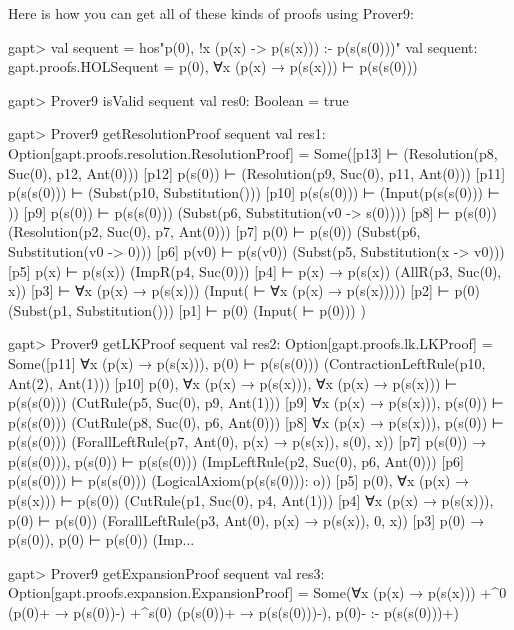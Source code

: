 \documentclass[a4paper,11pt]{book}
\begin{document}
Here is how you can get all of these kinds of proofs using Prover9:
\begin{clilisting}
gapt> val sequent = hos"p(0), !x (p(x) -> p(s(x))) :- p(s(s(0)))"
val sequent: gapt.proofs.HOLSequent = p(0), ∀x (p(x) → p(s(x))) ⊢ p(s(s(0)))

\end{clilisting}

\begin{clilisting}
gapt> Prover9 isValid sequent
val res0: Boolean = true

gapt> Prover9 getResolutionProof sequent
val res1: Option[gapt.proofs.resolution.ResolutionProof] =
Some([p13]  ⊢    (Resolution(p8, Suc(0), p12, Ant(0)))
[p12] p(s(0)) ⊢    (Resolution(p9, Suc(0), p11, Ant(0)))
[p11] p(s(s(0))) ⊢    (Subst(p10, Substitution()))
[p10] p(s(s(0))) ⊢    (Input(p(s(s(0))) ⊢ ))
[p9] p(s(0)) ⊢ p(s(s(0)))   (Subst(p6, Substitution(v0 -> s(0))))
[p8]  ⊢ p(s(0))   (Resolution(p2, Suc(0), p7, Ant(0)))
[p7] p(0) ⊢ p(s(0))   (Subst(p6, Substitution(v0 -> 0)))
[p6] p(v0) ⊢ p(s(v0))   (Subst(p5, Substitution(x -> v0)))
[p5] p(x) ⊢ p(s(x))   (ImpR(p4, Suc(0)))
[p4]  ⊢ p(x) → p(s(x))   (AllR(p3, Suc(0), x))
[p3]  ⊢ ∀x (p(x) → p(s(x)))   (Input( ⊢ ∀x (p(x) → p(s(x)))))
[p2]  ⊢ p(0)   (Subst(p1, Substitution()))
[p1]  ⊢ p(0)   (Input( ⊢ p(0)))
)

gapt> Prover9 getLKProof sequent
val res2: Option[gapt.proofs.lk.LKProof] =
Some([p11] ∀x (p(x) → p(s(x))), p(0) ⊢ p(s(s(0)))    (ContractionLeftRule(p10, Ant(2), Ant(1)))
[p10] p(0), ∀x (p(x) → p(s(x))), ∀x (p(x) → p(s(x))) ⊢ p(s(s(0)))    (CutRule(p5, Suc(0), p9, Ant(1)))
[p9] ∀x (p(x) → p(s(x))), p(s(0)) ⊢ p(s(s(0)))    (CutRule(p8, Suc(0), p6, Ant(0)))
[p8] ∀x (p(x) → p(s(x))), p(s(0)) ⊢ p(s(s(0)))    (ForallLeftRule(p7, Ant(0), p(x) → p(s(x)), s(0), x))
[p7] p(s(0)) → p(s(s(0))), p(s(0)) ⊢ p(s(s(0)))    (ImpLeftRule(p2, Suc(0), p6, Ant(0)))
[p6] p(s(s(0))) ⊢ p(s(s(0)))    (LogicalAxiom(p(s(s(0))): o))
[p5] p(0), ∀x (p(x) → p(s(x))) ⊢ p(s(0))    (CutRule(p1, Suc(0), p4, Ant(1)))
[p4] ∀x (p(x) → p(s(x))), p(0) ⊢ p(s(0))    (ForallLeftRule(p3, Ant(0), p(x) → p(s(x)), 0, x))
[p3] p(0) → p(s(0)), p(0) ⊢ p(s(0))    (Imp...

gapt> Prover9 getExpansionProof sequent
val res3: Option[gapt.proofs.expansion.ExpansionProof] =
Some(∀x (p(x) → p(s(x))) +^{0} (p(0)+ → p(s(0))-) +^{s(0)} (p(s(0))+ → p(s(s(0)))-),
p(0)-
:-
p(s(s(0)))+)

\end{clilisting}
\end{document}
